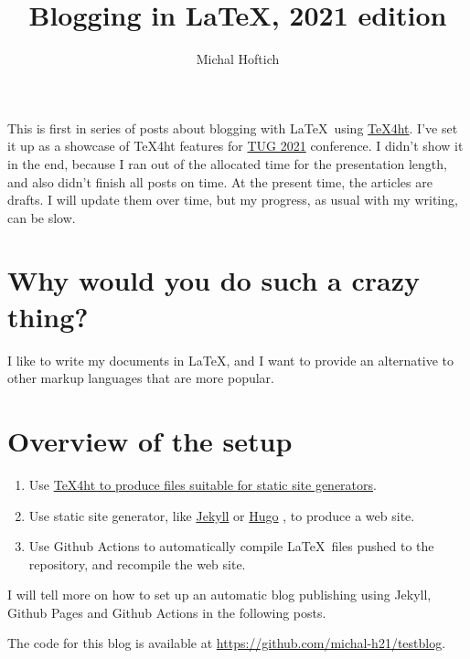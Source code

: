 \documentclass{article}
\title{Blogging in LaTeX, 2021 edition}
\author{Michal Hoftich}
\begin{document}
\maketitle



This is first in series of posts about blogging with \LaTeX\ using
\href{https://tug.org/tex4ht/}{\TeX4ht}. I've set it up as a showcase of
\TeX4ht features for \href{https://tug.org/tug2021/}{TUG 2021} conference.
I didn't show it in the end, because I ran out of the allocated time 
for the presentation length, and also didn't finish all posts on time. 
At the present time, the articles are drafts. I will update them over time,
but my progress, as usual with my writing, can be slow.

\tableofcontents

\section*{Why would you do such a crazy thing?}

I like to write my documents in \LaTeX, and I want to provide an alternative
to other markup languages that are more popular. 



\section*{Overview of the setup}

\begin{enumerate}
\item Use \href{/testblog/2021/07/30/how-to-blog-with-tex4ht.html}
{\TeX4ht to produce files suitable for static site generators}.
\item Use static site generator, like \href{https://jekyllrb.com/}{Jekyll}
or \href{https://gohugo.io/}{Hugo}
, to produce a web site.
\item Use Github Actions to automatically compile \LaTeX\ files pushed
to the repository, and recompile the web site. 
\end{enumerate}

I will tell more on how to set up an automatic
blog publishing using Jekyll, Github Pages and Github Actions in the following posts.

The code for this blog is available at
\url{https://github.com/michal-h21/testblog}.
\end{document}
